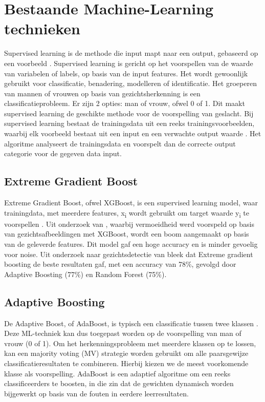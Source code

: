 \section{Bestaande Machine-Learning technieken} \label{sec:bestaandeml}
Supervised learning is de methode die input mapt naar een output, gebaseerd op een voorbeeld \autocite{Rustam2018}. Supervised learning is gericht op het voorspellen van de waarde van variabelen of labels, op basis van de input features. Het wordt gewoonlijk gebruikt voor classificatie, benadering, modelleren of identificatie. Het groeperen van mannen of vrouwen op basis van gezichtsherkenning is een classificatieprobleem. Er zijn 2 opties: man of vrouw, ofwel 0 of 1. Dit maakt supervised learning de geschikte methode voor de voorspelling van geslacht. Bij supervised learning bestaat de trainingsdata uit een reeks trainingsvoorbeelden, waarbij elk voorbeeld bestaat uit een input en een verwachte output waarde \autocite{Shah2012}. Het algoritme analyseert de trainingsdata en voorspelt dan de correcte output categorie voor de gegeven data input.  

\subsection{Extreme Gradient Boost}
\label{sub:xgboost}
Extreme Gradient Boost, ofwel XGBoost, is een supervised learning model, waar trainingdata, met meerdere features, x\textsubscript{i} wordt gebruikt om target waarde y\textsubscript{i} te voorspellen \autocite{XGBoost2023}. Uit onderzoek van \autocite{Chen2023}, waarbij vermoeidheid werd voorspeld op basis van gezichtsafbeeldingen met XGBoost, wordt een boom aangemaakt op basis van de geleverde features. Dit model gaf een hoge accuracy en is minder gevoelig voor noise. Uit onderzoek naar gezichtsdetectie van \textcite{Sanil2023} bleek dat Extreme gradient boosting de beste resultaten gaf, met een accuracy van 78\%, gevolgd door Adaptive Boosting (77\%) en Random Forest (75\%). 

\subsection{Adaptive Boosting}
\label{sub:adaboost}
De Adaptive Boost, of AdaBoost, is typisch een classificatie tussen twee klassen  \autocite{Guo2001}. Deze ML-techniek kan dus toegepast worden op de voorspelling van man of vrouw (0 of 1). Om het herkenningsprobleem met meerdere klassen op te lossen, kan een majority voting (MV) strategie worden gebruikt om alle paarsgewijze classificatieresultaten te combineren. Hierbij kiezen we de meest voorkomende klasse als voorspelling. AdaBoost is een adaptief algoritme om een reeks classificeerders te boosten, in die zin dat de gewichten dynamisch worden bijgewerkt op basis van de fouten in eerdere leerresultaten.

